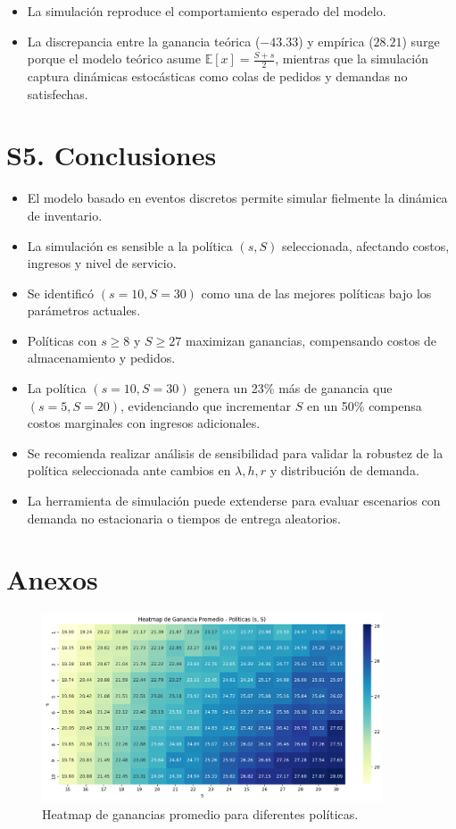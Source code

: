 \documentclass{report}
\begin{document}
\begin{itemize}
\item La simulación reproduce el comportamiento esperado del modelo.
\item La discrepancia entre la ganancia teórica (\(-43.33\)) y empírica (\(28.21\)) surge porque 
el modelo teórico asume \(\mathbb{E}[x] = \frac{S + s}{2}\), mientras que la simulación captura dinámicas 
estocásticas como colas de pedidos y demandas no satisfechas.
\end{itemize}


\section*{S5. Conclusiones}

\begin{itemize}
\item El modelo basado en eventos discretos permite simular fielmente la dinámica de 
inventario.
\item La simulación es sensible a la política \((s, S)\) seleccionada, afectando costos, 
ingresos y nivel de servicio.
\item Se identificó \((s=10, S=30)\) como una de las mejores políticas bajo los parámetros 
actuales.
\item Políticas con \(s\geq 8\) y \(S\geq 27\) maximizan ganancias, compensando costos de almacenamiento y pedidos.
\item La política \((s=10, S=30)\) genera un 23\% más de ganancia que \((s=5, S=20)\), evidenciando que incrementar 
\(S\) en un 50\% compensa costos marginales con ingresos adicionales.
\item Se recomienda realizar análisis de sensibilidad para validar la robustez de la política 
seleccionada ante cambios en \(\lambda, h, r\) y distribución de demanda.
\item La herramienta de simulación puede extenderse para evaluar escenarios con demanda no 
estacionaria o tiempos de entrega aleatorios.
\end{itemize}


\section*{Anexos}

\begin{figure}[h]
    \centering
    \includegraphics[width=0.9\textwidth]{ganacias_promedio_variando_politica.png}
    \caption{Heatmap de ganancias promedio para diferentes políticas.}
\end{figure}
\end{document}
